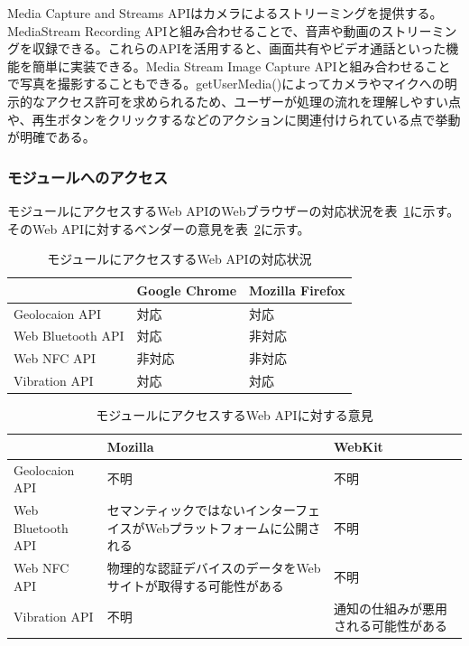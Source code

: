 Media Capture and Streams APIはカメラによるストリーミングを提供する。MediaStream Recording APIと組み合わせることで、音声や動画のストリーミングを収録できる。これらのAPIを活用すると、画面共有やビデオ通話といった機能を簡単に実装できる。Media Stream Image Capture APIと組み合わせることで写真を撮影することもできる。getUserMedia()によってカメラやマイクへの明示的なアクセス許可を求められるため、ユーザーが処理の流れを理解しやすい点や、再生ボタンをクリックするなどのアクションに関連付けられている点で挙動が明確である。

\subsubsection{モジュールへのアクセス}\label{subsubsection:モジュールへのアクセス}
モジュールにアクセスするWeb APIのWebブラウザーの対応状況を表~\ref{table:モジュールにアクセスするWeb APIの対応状況}に示す。そのWeb APIに対するベンダーの意見を表~\ref{table:モジュールにアクセスするWeb APIに対する意見}に示す。
\begin{table}
  \caption{モジュールにアクセスするWeb APIの対応状況}
  \label{table:モジュールにアクセスするWeb APIの対応状況}
  \centering
  \begin{tabular}{|p{13em}|p{8em}|p{8em}|}
    \hline
    & Google Chrome & Mozilla Firefox \\ \hline
    Geolocaion API & \cellcolor{green!25}対応 & \cellcolor{green!25}対応 \\ \hline
    Web Bluetooth API & \cellcolor{green!25}対応 & \cellcolor{red!25}非対応 \\ \hline
    Web NFC API & \cellcolor{red!25}非対応 & \cellcolor{red!25}非対応 \\ \hline
    Vibration API & \cellcolor{green!25}対応 & \cellcolor{green!25}対応 \\ \hline
  \end{tabular}
\end{table}
\begin{table}
    \centering
    \caption{モジュールにアクセスするWeb APIに対する意見}
    \label{table:モジュールにアクセスするWeb APIに対する意見}
    \begin{tabular}{|p{13em}|p{13em}|p{13em}|}
         \hline
         & Mozilla & WebKit \\ \hline
         Geolocaion API & 不明 & 不明 \\ \hline
         Web Bluetooth API & \cellcolor{red!25}セマンティックではないインターフェイスがWebプラットフォームに公開される~\cite{MozillaWebBluetoothAPI} & 不明 \\ \hline
         Web NFC API & \cellcolor{red!25}物理的な認証デバイスのデータをWebサイトが取得する可能性がある~\cite{MozillaWebNFCAPI} & 不明 \\ \hline
         Vibration API & 不明 & \cellcolor{red!25}通知の仕組みが悪用される可能性がある \\ \hline
    \end{tabular}
\end{table}
